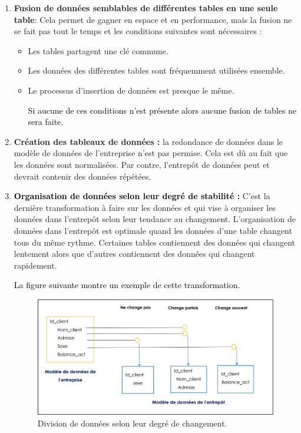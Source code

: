 \documentclass[a4paper,12pt]{report}
\begin{document}
\begin{enumerate}
\begin{figure}[H]
\end{figure}


\item \textbf{Fusion de données semblables de différentes tables en une seule table}: Cela permet de gagner en espace et en performance, mais la fusion ne se fait pas tout le temps et les conditions suivantes sont nécessaires \citep{inmon2000} :

\begin{itemize}

\item Les tables partagent une clé commune.
\item Les données des différentes tables sont fréquemment utilisées ensemble.
\item Le processus d’insertion de données est presque le même.

\textcolor{black}{Si aucune de ces conditions n’est présente alors aucune fusion de tables ne sera faite.} 

\end{itemize}

\item \textbf{Création des tableaux de données :} la redondance de données dans le modèle de données de l’entreprise n’est pas permise. Cela est dû au fait que les données sont normalisées. Par contre, l’entrepôt de données peut et devrait contenir des données répétées.

\item \textcolor{black}{ \textbf{Organisation de données selon leur degré de stabilité :}} C’est la dernière transformation à faire sur les données et qui vise à organiser les données dans l’entrepôt selon leur tendance au changement. L’organisation de données dans l’entrepôt est optimale quand les données d’une table changent tous du même rythme. Certaines tables contiennent des données qui changent lentement alors que d’autres contiennent des données qui changent rapidement.

\textcolor{black}{La figure suivante montre un exemple de cette transformation.}

\begin{figure}[H]

\begin{center}
\includegraphics[width=0.7\linewidth]{./images/10}
\end{center}

\caption{Division de données selon leur degré de changement. \citep{inmon2000}}
\label{fig:10}

\end{figure}

\end{enumerate}
\end{document}

